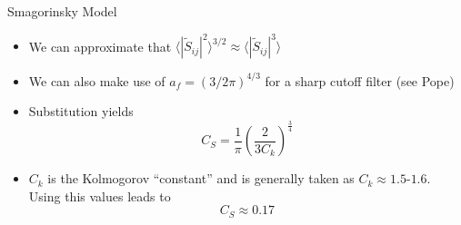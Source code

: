 \begin{frame}{Smagorinsky Model}

\begin{itemize}
	\item We can approximate that $\langle |\widetilde{S}_{ij}|^2\rangle^{3/2} \approx \langle |\widetilde{S}_{ij}|^3 \rangle$
	\item We can also make use of $a_f =(3/2\pi)^{4/3}$ for a sharp cutoff filter (see Pope)
	\item Substitution yields
	$$C_S = \frac{1}{\pi}\left(\frac{2}{3C_k}\right)^{\frac{3}{4}}$$
	\item $C_k$ is the Kolmogorov ``constant'' and is generally taken as $C_k\approx 1.5$-$1.6$. Using this values leads to
	$$\boxed{C_S \approx 0.17}$$
\end{itemize}

\end{frame}




